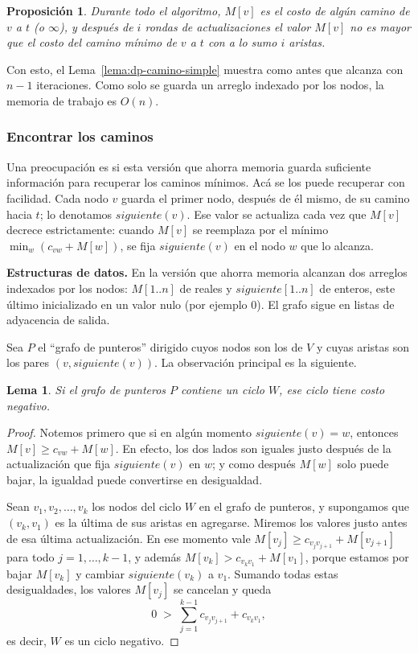 \documentclass[12pt, spanish, oneside, openany]{book}
\newenvironment{estructuras}%
  {\begin{center}\begin{minipage}{0.93\textwidth}\begin{mdframed}[style=estrbox]%
   \small\textbf{Estructuras de datos.}\;}%
  {\end{mdframed}\end{minipage}\end{center}}
\theoremstyle{uprightplain}
\newtheorem{lema}[teorema]{Lema}
\newtheorem{proposicion}[teorema]{Proposición}
\theoremstyle{definition}
\theoremstyle{remark}
\theoremstyle{definition}
\begin{document}
\begin{proposicion}
\label{prop:dp-bf-memoria}
Durante todo el algoritmo, $M[v]$ es el costo de algún camino de $v$ a $t$ (o $\infty$), y después de $i$ rondas de actualizaciones el valor $M[v]$ no es mayor que el costo del camino mínimo de $v$ a $t$ con a lo sumo $i$ aristas.
\end{proposicion}

Con esto, el Lema~\ref{lema:dp-camino-simple} muestra como antes que alcanza con $n-1$ iteraciones. Como solo se guarda un arreglo indexado por los nodos, la memoria de trabajo es $O(n)$.

\subsubsection{Encontrar los caminos}

Una preocupación es si esta versión que ahorra memoria guarda suficiente información para recuperar los caminos mínimos. Acá se los puede recuperar con facilidad. Cada nodo $v$ guarda el primer nodo, después de él mismo, de su camino hacia $t$; lo denotamos $\mathit{siguiente}(v)$. Ese valor se actualiza cada vez que $M[v]$ decrece estrictamente: cuando $M[v]$ se reemplaza por el mínimo $\min_w(c_{vw}+M[w])$, se fija $\mathit{siguiente}(v)$ en el nodo $w$ que lo alcanza.

\begin{estructuras}
En la versión que ahorra memoria alcanzan dos arreglos indexados por los nodos:
$M[1..n]$ de reales y $\mathit{siguiente}[1..n]$ de enteros, este último
inicializado en un valor nulo (por ejemplo $0$). El grafo sigue en listas de
adyacencia de salida.
\end{estructuras}

Sea $P$ el ``grafo de punteros'' dirigido cuyos nodos son los de $V$ y cuyas aristas son los pares $(v,\mathit{siguiente}(v))$. La observación principal es la siguiente.

\begin{lema}
\label{lema:dp-punteros}
Si el grafo de punteros $P$ contiene un ciclo $W$, ese ciclo tiene costo negativo.
\end{lema}
\begin{proof}
Notemos primero que si en algún momento $\mathit{siguiente}(v)=w$, entonces $M[v]\ge c_{vw}+M[w]$. En efecto, los dos lados son iguales justo después de la actualización que fija $\mathit{siguiente}(v)$ en $w$; y como después $M[w]$ solo puede bajar, la igualdad puede convertirse en desigualdad.

Sean $v_1,v_2,\dots,v_k$ los nodos del ciclo $W$ en el grafo de punteros, y supongamos que $(v_k,v_1)$ es la última de sus aristas en agregarse. Miremos los valores justo antes de esa última actualización. En ese momento vale $M[v_j]\ge c_{v_jv_{j+1}}+M[v_{j+1}]$ para todo $j=1,\dots,k-1$, y además $M[v_k]>c_{v_kv_1}+M[v_1]$, porque estamos por bajar $M[v_k]$ y cambiar $\mathit{siguiente}(v_k)$ a $v_1$. Sumando todas estas desigualdades, los valores $M[v_j]$ se cancelan y queda
\[
0 \;>\; \sum_{j=1}^{k-1}c_{v_jv_{j+1}} + c_{v_kv_1},
\]
es decir, $W$ es un ciclo negativo.
\end{proof}
\end{document}
